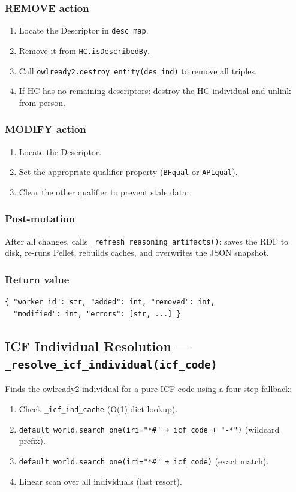 ﻿\documentclass[12pt,a4paper]{article}
\begin{document}
\subsubsection*{REMOVE action}
\begin{enumerate}[noitemsep]
  \item Locate the Descriptor in \texttt{desc\_map}.
  \item Remove it from \texttt{HC.isDescribedBy}.
  \item Call \texttt{owlready2.destroy\_entity(des\_ind)} to remove all triples.
  \item If HC has no remaining descriptors: destroy the HC individual and unlink from person.
\end{enumerate}

\subsubsection*{MODIFY action}
\begin{enumerate}[noitemsep]
  \item Locate the Descriptor.
  \item Set the appropriate qualifier property (\texttt{BFqual} or \texttt{AP1qual}).
  \item Clear the other qualifier to prevent stale data.
\end{enumerate}

\subsubsection*{Post-mutation}
After all changes, calls \texttt{\_refresh\_reasoning\_artifacts()}: saves the RDF to disk, re-runs Pellet, rebuilds caches, and overwrites the JSON snapshot.

\subsubsection*{Return value}
\begin{lstlisting}
{ "worker_id": str, "added": int, "removed": int,
  "modified": int, "errors": [str, ...] }
\end{lstlisting}

\subsection{ICF Individual Resolution --- \texttt{\_resolve\_icf\_individual(icf\_code)}}

Finds the owlready2 individual for a pure ICF code using a four-step fallback:
\begin{enumerate}[noitemsep]
  \item Check \texttt{\_icf\_ind\_cache} (O(1) dict lookup).
  \item \texttt{default\_world.search\_one(iri="*\#" + icf\_code + "-*")} (wildcard prefix).
  \item \texttt{default\_world.search\_one(iri="*\#" + icf\_code)} (exact match).
  \item Linear scan over all individuals (last resort).
\end{enumerate}
\end{document}
